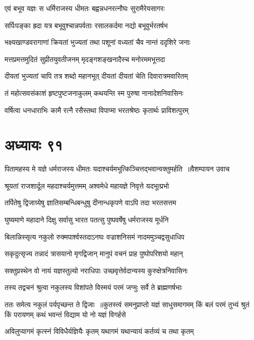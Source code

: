 \twolineshloka
{एवं बभूव यज्ञः स धर्मिराजस्य धीमतः}
{बह्वन्नधनरत्नौघः सुरामैरेयसागरः}


\twolineshloka
{सर्पिःपङ्का ह्रदा यत्र बभूवुश्चान्नपर्वताः}
{रसालकर्दमा नद्यो बभूवुर्भरतर्षभ}


\twolineshloka
{भक्ष्यखाण्डवरागाणां क्रियतां भुज्यतां तथा}
{पशूनां वध्यतां चैव नान्तं ददृशिरे जनाः}


\threelineshloka
{मत्तप्रमत्तमुदितं सुप्रीतयुवतीजनम्}
{मृदङ्गशङ्खनादैस्च मनोरममभूत्तदा}
{}


\twolineshloka
{दीयतां भुज्यतां चापि तत्र शब्दो महानभूत्}
{दीयतां दीयतां चेति दिवारात्रमवारितम्}


\twolineshloka
{तं महोत्सवसंकाशं हृष्टपुष्टजनाकुलम्}
{कथयन्ति स्म पुरुषा नानादेशनिवासिनः}


\twolineshloka
{वर्षित्वा धनधाराभिः कामै रत्नै रसैस्तथा}
{विपाप्मा भरतश्रेष्ठः कृतार्थः प्राविशत्पुरम्}


\chapter{अध्यायः ९१}
\threelineshloka
{पितामहस्य मे यज्ञे धर्मराजस्य धीमतः}
{यदाश्चर्यमभूत्किञ्चित्तद्भवान्वक्तुमर्हति ॥वैशम्पायन उवाच}
{}


\twolineshloka
{श्रूयतां राजशार्दूल महदाश्चर्यमुत्तमम्}
{अश्वमेधे महायज्ञे निवृत्ते यदभूत्प्रभो}


\twolineshloka
{तर्पितेषु द्विजाग्र्येषु ज्ञातिसम्बन्धिबन्धुषु}
{दीनान्धकृपणे वाऽपि तदा भरतसत्तम}


\twolineshloka
{घुष्यमाणे महादाने दिक्षु सर्वासु भारत}
{पतत्सु पुष्पवर्षेषु धर्मराजस्य मूर्धनि}


\twolineshloka
{बिलान्निस्सृत्य नकुलो रुक्मपार्श्वस्तदाऽनघः}
{वज्राशनिसमं नादममुञ्चद्वसुधाधिप}


\twolineshloka
{सकृदुत्सृज्य तन्नादं त्रासयानो मृगद्विजान्}
{मानुपं वचनं प्राह पुष्पोपरिशयो महान्}


\twolineshloka
{सक्तुप्रस्थेन वो नायं यज्ञस्तुल्यो नराधिपाः}
{उच्छवृत्तेर्वदान्यस्य कुरुक्षेत्रनिवासिनः}


\twolineshloka
{तस्य तद्वचनं श्रुत्वा नकुलस्य विशांपते}
{विस्मयं परमं जग्मुः सर्वे ते ब्राह्मणर्षभाः}


ततः समेत्य नकुलं पर्यपृच्छन्त ते द्विजाः ॥कुतस्त्वं समनुप्राप्तो यज्ञं साधुसमागमम्
\twolineshloka
{किं बलं परमं तुभ्यं श्रुतं किं परायणम्}
{कथं भवन्तं विद्याम यो नो यज्ञं विगर्हसे}


\twolineshloka
{अविलुप्यागमं कृत्स्नं विविधैर्यज्ञियैः कृतम्}
{यथागमं यथान्यायं कर्तव्यं च तथा कृतम्}


